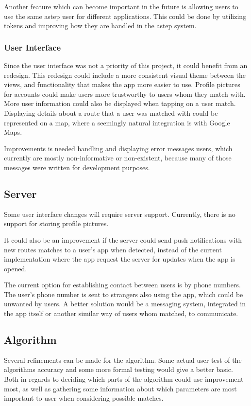 Another feature which can become important in the future is allowing users to use the same \gls{astep} user for different applications.
This could be done by utilizing tokens and improving how they are handled in the \gls{astep} system.

\subsubsection*{User Interface}
Since the user interface was not a priority of this project, it could benefit from an redesign.
This redesign could include a more consistent visual theme between the views, and functionality that makes the app more easier to use.
Profile pictures for accounts could make  users more trustworthy to users whom they match with.
More user information could also be displayed when tapping on a user match.
Displaying details about a route that a user was matched with could be represented on a map, where a seemingly natural integration is with Google Maps.

Improvements is needed handling and displaying error messages users, which currently are mostly non-informative or non-existent, because many of those messages were written for development purposes.

\subsection{Server}
Some user interface changes will require server support.
Currently, there is no support for storing profile pictures.

It could also be an improvement if the server could send push notifications with new routes matches to a user's app when detected, instead of the current implementation where the app request the server for updates when the app is opened.

The current option for establishing contact between users is by phone numbers.
The user's phone number is sent to strangers also using the app, which could be unwanted by users.
A better solution would be a messaging system, integrated in the app itself or another similar way of users whom matched, to communicate.

\subsection{Algorithm}
Several refinements can be made for the algorithm.
Some actual user test of the algorithms accuracy and some more formal testing would give a better basic.
Both in regards to deciding which parts of the algorithm could use improvement most, as well as gathering some information about which parameters are most important to user when considering possible matches.

